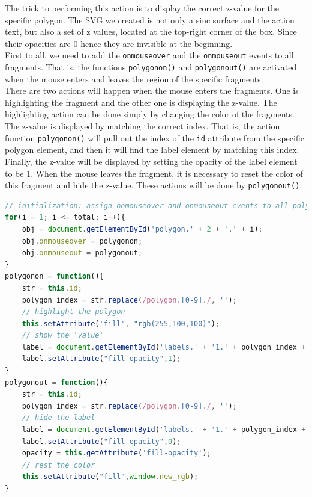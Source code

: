 \documentclass[11pt,twoside]{report}
\begin{document}
The trick to performing this action is to display the correct z-value for the specific polygon. The SVG we created is not only a sinc surface and the action text, but also a set of z values, located at the top-right corner of the box. Since their opacities are 0 hence they are invisible at the beginning.\\

First to all, we need to add the \texttt{onmouseover} and the \texttt{onmouseout} events to all fragments. That is, the functions \texttt{polygonon()} and \texttt{polygonout()} are activated when the mouse enters and leaves the region of the specific fragments.\\

There are two actions will happen when the mouse enters the fragments. One is highlighting the fragment and the other one is displaying the z-value. The highlighting action can be done simply by changing the color of the fragments. The z-value is displayed by matching the correct index. That is, the action function \texttt{polygonon()} will pull out the index of the \texttt{id} attribute from the specific polygon element, and then it will find the label element by matching this index. Finally, the z-value will be displayed by setting the opacity of the label element to be 1. When the mouse leaves the fragment, it is necessary to reset the color of this fragment and hide the z-value. These actions will be done by \texttt{polygonout()}.\\

\begin{lstlisting}[language = JavaScript]
// initialization: assign onmouseover and onmouseout events to all polygons
for(i = 1; i <= total; i++){
    obj = document.getElementById('polygon.' + 2 + '.' + i);
    obj.onmouseover = polygonon;
    obj.onmouseout = polygonout;
}
polygonon = function(){
    str = this.id;
    polygon_index = str.replace(/polygon.[0-9]./, '');
    // highlight the polygon
    this.setAttribute('fill', "rgb(255,100,100)");
    // show the 'value'
    label = document.getElementById('labels.' + '1.' + polygon_index + '.text');
    label.setAttribute("fill-opacity",1);
}
polygonout = function(){
    str = this.id;
    polygon_index = str.replace(/polygon.[0-9]./, '');
    // hide the label
    label = document.getElementById('labels.' + '1.' + polygon_index + '.text');
    label.setAttribute("fill-opacity",0);
    opacity = this.getAttribute('fill-opacity');
    // rest the color
    this.setAttribute("fill",window.new_rgb);
}
\end{lstlisting}
\end{document}
